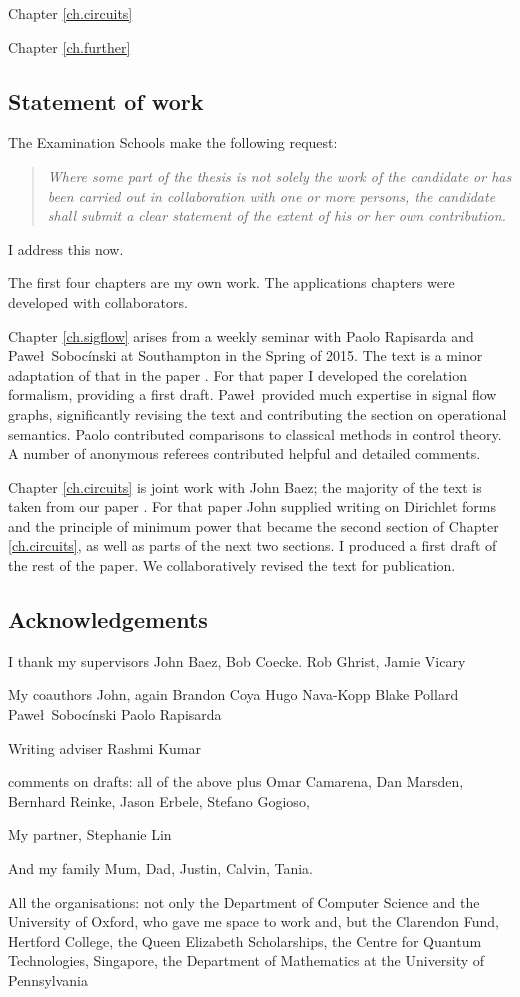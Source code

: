 Chapter \ref{ch.circuits}

Chapter \ref{ch.further}


\subsection*{Statement of work}

The Examination Schools make the following request:
\begin{quote}
\emph{Where some part of the thesis is not solely the work of the candidate or
has been carried out in collaboration with one or more persons, the candidate
shall submit a clear statement of the extent of his or her own contribution.}
\end{quote}
I address this now. 

The first four chapters are my own work. The applications chapters were
developed with collaborators. 

Chapter \ref{ch.sigflow} arises from a weekly seminar with Paolo Rapisarda and
Pawe\l\ Soboc\'inski at Southampton in the Spring of 2015. The text is a minor
adaptation of that in the paper \cite{FRS16}. For that paper I developed the
corelation formalism, providing a first draft. Pawe\l\ provided much expertise
in signal flow graphs, significantly revising the text and contributing the
section on operational semantics. Paolo contributed comparisons to classical
methods in control theory.  A number of anonymous referees contributed helpful
and detailed comments.

Chapter \ref{ch.circuits} is joint work with John Baez; the majority of the text
is taken from our paper \cite{BF}. For that paper John supplied writing on
Dirichlet forms and the principle of minimum power that became the second
section of Chapter \ref{ch.circuits}, as well as parts of the next two sections.
I produced a first draft of the rest of the paper. We collaboratively revised
the text for publication.

\subsection*{Acknowledgements}
I thank my supervisors John Baez, Bob Coecke. Rob Ghrist, Jamie Vicary 

My coauthors
John, again
Brandon Coya
Hugo Nava-Kopp
Blake Pollard
Pawe\l\ Soboc\'inski
Paolo Rapisarda

Writing adviser Rashmi Kumar

comments on drafts:
all of the above plus Omar Camarena, Dan Marsden, Bernhard Reinke, Jason Erbele,
Stefano Gogioso,

My partner, Stephanie Lin

And my family Mum, Dad, Justin, Calvin, Tania.

All the organisations: not only the Department of Computer Science and the
University of Oxford, who gave me space to work and, but the Clarendon Fund,
Hertford College, the Queen Elizabeth Scholarships, the Centre for Quantum
Technologies, Singapore, the Department of Mathematics at the University of Pennsylvania

